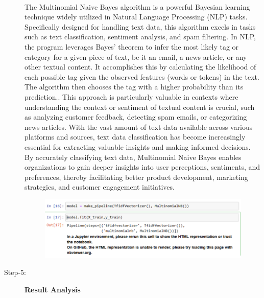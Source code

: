 \begin{description}
\\
The Multinomial Naive Bayes algorithm is a powerful Bayesian learning technique widely utilized in Natural Language Processing (NLP) tasks. Specifically designed for handling text data, this algorithm excels in tasks such as text classification, sentiment analysis, and spam filtering. In NLP, the program leverages Bayes' theorem to infer the most likely tag or category for a given piece of text, be it an email, a news article, or any other textual content. It accomplishes this by calculating the likelihood of each possible tag given the observed features (words or tokens) in the text. The algorithm then chooses the tag with a higher probability than its prediction.. This approach is particularly valuable in contexts where understanding the context or sentiment of textual content is crucial, such as analyzing customer feedback, detecting spam emails, or categorizing news articles. With the vast amount of text data available across various platforms and sources, text data classification has become increasingly essential for extracting valuable insights and making informed decisions. By accurately classifying text data, Multinomial Naive Bayes enables organizations to gain deeper insights into user perceptions, sentiments, and preferences, thereby facilitating better product development, marketing strategies, and customer engagement initiatives.
\\

 \begin{figure}[hbt!]
  \centering
 \includegraphics[width=0.8\linewidth]{C_chap/fig17.png}
\end{figure}

\item[Step-5:] \textbf{Result Analysis}


\end{description}
